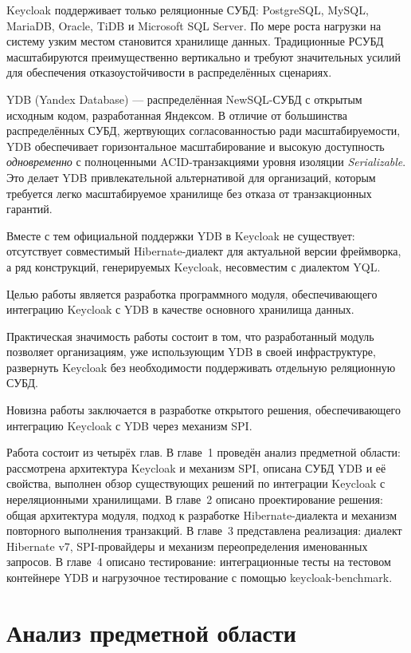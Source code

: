 \documentclass[times]{itmo-student-thesis}
\begin{document}
Keycloak поддерживает только реляционные СУБД: PostgreSQL, MySQL, MariaDB,
Oracle, TiDB и Microsoft SQL Server. По мере роста нагрузки на систему 
узким местом становится хранилище данных. Традиционные РСУБД масштабируются
преимущественно вертикально и требуют значительных усилий для обеспечения
отказоустойчивости в распределённых сценариях.

YDB (Yandex Database) --- распределённая NewSQL-СУБД с открытым исходным кодом,
разработанная Яндексом. В отличие от большинства распределённых СУБД, жертвующих 
согласованностью ради масштабируемости, YDB обеспечивает горизонтальное масштабирование
и высокую доступность \textit{одновременно} с полноценными ACID-транзакциями уровня
изоляции \textit{Serializable}. Это делает YDB привлекательной альтернативой для
организаций, которым требуется легко масштабируемое хранилище без отказа от
транзакционных гарантий.

Вместе с тем официальной поддержки YDB в Keycloak не существует: отсутствует
совместимый Hibernate-диалект для актуальной версии фреймворка, а ряд
конструкций, генерируемых Keycloak, несовместим с диалектом YQL.

Целью работы является разработка программного модуля, обеспечивающего интеграцию
Keycloak с YDB в качестве основного хранилища данных.

Практическая значимость работы состоит в том, что разработанный модуль позволяет
организациям, уже использующим YDB в своей инфраструктуре, развернуть Keycloak
без необходимости поддерживать отдельную реляционную СУБД.

Новизна работы заключается в разработке открытого решения, обеспечивающего
интеграцию Keycloak с YDB через механизм SPI.

Работа состоит из четырёх глав. В главе~1 проведён анализ предметной области:
рассмотрена архитектура Keycloak и механизм SPI, описана СУБД YDB и её свойства,
выполнен обзор существующих решений по интеграции Keycloak с нереляционными
хранилищами. В главе~2 описано проектирование решения: общая архитектура модуля,
подход к разработке Hibernate-диалекта и механизм повторного выполнения транзакций.
В главе~3 представлена реализация: диалект Hibernate v7, SPI-провайдеры и механизм
переопределения именованных запросов. В главе~4 описано тестирование: интеграционные
тесты на тестовом контейнере YDB и нагрузочное тестирование с помощью keycloak-benchmark.

\chapter{Анализ предметной области}
\end{document}
